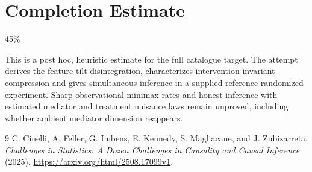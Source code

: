 \documentclass[11pt]{article}
\theoremstyle{remark}
\begin{document}
\section{Completion Estimate}
45\%

This is a post hoc, heuristic estimate for the full catalogue target.
The attempt derives the feature-tilt disintegration, characterizes intervention-invariant compression and gives simultaneous inference in a supplied-reference randomized experiment. Sharp observational minimax rates and honest inference with estimated mediator and treatment nuisance laws remain unproved, including whether ambient mediator dimension reappears.

\begin{thebibliography}{9}
 C. Cinelli, A. Feller, G. Imbens, E. Kennedy, S. Magliacane, and J. Zubizarreta. \emph{Challenges in Statistics: A Dozen Challenges in Causality and Causal Inference} (2025). \url{https://arxiv.org/html/2508.17099v1}.
\end{thebibliography}
\end{document}
